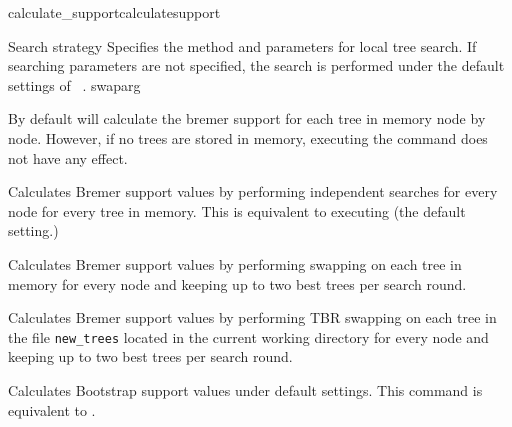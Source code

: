 \begin{command}{calculate\_support}{calculatesupport}
\begin{arguments}
\begin{argumentgroup}{Search strategy}
            {Specifies the method and parameters for local tree search. If searching
            parameters are not specified, the search is performed under
            the default settings of ~.} 
            {swaparg}
	     
        		\end{argumentgroup}

	\end{arguments}

    {By default \poy will calculate the bremer support for each tree in memory node by node.
    However, if no trees are stored in memory, executing the command
     does not have any effect.}
    
    

	\begin{poyexamples} 

            {Calculates Bremer support values by performing
            independent searches for every node for every tree in memory. This is equivalent to executing  (the default setting.)}
         
            {Calculates Bremer support values by performing swapping on 
            each tree in memory for every node and keeping up to two
            best trees per search round.}
          
            {Calculates Bremer support values by performing TBR swapping on 
            each tree in the file \texttt{new\_trees} located in the current
            working directory for every node and keeping up to two
            best trees per search round.}  
            
         {Calculates Bootstrap support values under default settings. This command
         is equivalent to .}
	

\end{poyexamples}
\end{command}
